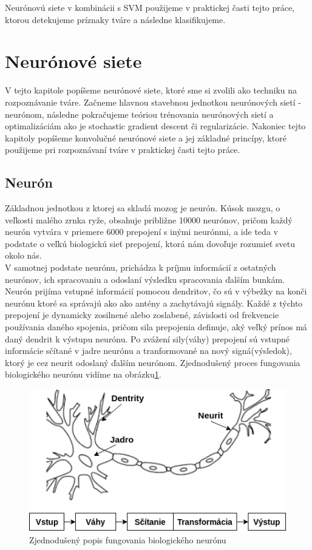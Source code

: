 \indent Neurónovú siete v kombinácii s SVM použijeme v praktickej časti tejto práce, ktorou detekujeme príznaky tváre a následne klasifikujeme.

\newpage 

\section{Neurónové siete}
V tejto kapitole popíšeme neurónové siete, ktoré sme si zvolili ako techniku na rozpoznávanie tváre.
Začneme hlavnou stavebnou jednotkou neurónových sietí - neurónom, následne pokračujeme teóriou trénovania neurónových sietí a optimalizáciám
ako je stochastic gradient descent či regularizácie.
Nakoniec tejto kapitoly popíšeme konvolučné neurónové siete a jej základné princípy, ktoré použijeme pri rozpoznávaní tváre v praktickej časti tejto práce.

\subsection{Neurón}
Základnou jednotkou z ktorej sa skladá mozog je neurón.
Kúsok mozgu, o veľkosti malého zrnka ryže, obsahuje približne 10000 neurónov, pričom každý neurón
vytvára v priemere 6000 prepojení s inými neurónmi, a ide teda v podstate o
veľkú biologickú sieť prepojení, ktorá nám dovoľuje rozumieť svetu okolo nás\cite{buduma2017fundamentals}. \\
\indent V samotnej podstate neurónu, prichádza k príjmu informácií z ostatných neurónov, 
ich spracovaniu a odoslaní výsledku spracovania ďalším bunkám.
Neurón prijíma vstupné informácií pomocou dendritov, čo sú v výbežky na konči neurónu ktoré sa správajú ako 
ako antény a zachytávajú signály.
Každé z týchto prepojení je dynamicky zosilnené alebo zoslabené, závislosti od frekvencie používania daného spojenia, pričom sila prepojenia definuje, aký veľký prínos má daný dendrit k výstupu neurónu\cite{buduma2017fundamentals}.
Po zvážení sily(váhy) prepojení sú vstupné informácie sčítané v jadre neurónu a tranformované na 
nový signá(výsledok), ktorý je cez neurit odoslaný ďalším neurónom.
Zjednodušený proces fungovania biologického neurónu vidíme na obrázku\ref{fig:bioneuron}.

\begin{figure}[H]
	\centering
	\includegraphics[width=0.5\linewidth]{img/bioneuron}
	\caption{Zjednodušený popis fungovania biologického neurónu}
	\label{fig:bioneuron}
\end{figure}

